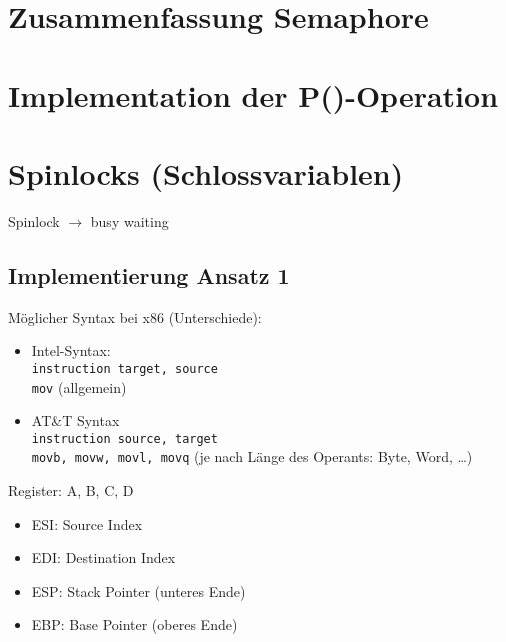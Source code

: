 \section{Zusammenfassung Semaphore}
\section{Implementation der P()-Operation}
\section{Spinlocks (Schlossvariablen)}
Spinlock $\to$ busy waiting
\subsection{Implementierung Ansatz 1}
Möglicher Syntax bei x86 (Unterschiede):
\begin{itemize}
\item Intel-Syntax:\\
\lstinline$instruction target, source$\\
\lstinline$mov$ (allgemein)
\item AT\&T Syntax\\
\lstinline$instruction source, target$\\
\lstinline$movb, movw, movl, movq$ (je nach Länge des Operants: Byte, Word, …)
\end{itemize}
Register: A, B, C, D
\begin{center}
\end{center}
\begin{itemize}
\item ESI: Source Index
\item EDI: Destination Index
\item ESP: Stack Pointer (unteres Ende)
\item EBP: Base Pointer (oberes Ende)
\end{itemize}
